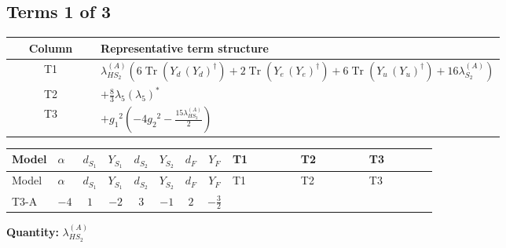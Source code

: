 \documentclass[8pt]{article}
\begin{document}
\begin{landscape}
\subsection*{Terms 1 of 3}
\begin{center}
\begin{tabular}{@{}c >{\raggedright\arraybackslash}p{0.82\linewidth}@{}}
\toprule
Column & Representative term structure \\
\midrule
T1 & \(\displaystyle {\lambda_{HS_2}^{(A)}} (6 \operatorname{Tr}\!\left({Y_d}\,\left({Y_d}\right)^{\dagger}\right)+2 \operatorname{Tr}\!\left({Y_e}\,\left({Y_e}\right)^{\dagger}\right)+6 \operatorname{Tr}\!\left({Y_u}\,\left({Y_u}\right)^{\dagger}\right)+16 {\lambda_{S_2}^{(A)}})\) \\
\midrule
T2 & \(\displaystyle +\frac{8}{3} {\lambda_5} \left({\lambda_5}\right)^{*}\) \\
\midrule
T3 & \(\displaystyle +{g_1}^2 \left(-4 {g_2}^2-\frac{15 {\lambda_{HS_2}^{(A)}}}{2}\right)\) \\
\midrule
\bottomrule
\end{tabular}
\end{center}
\smallskip
\tiny
\begin{longtable}{@{}llcccccc >{\raggedright\arraybackslash}p{0.21\linewidth} >{\raggedright\arraybackslash}p{0.21\linewidth} >{\raggedright\arraybackslash}p{0.21\linewidth}@{}}
\toprule
Model & $\alpha$ & $d_{S_1}$ & $Y_{S_1}$ & $d_{S_2}$ & $Y_{S_2}$ & $d_F$ & $Y_F$ & T1 & T2 & T3 \\
\midrule
\endfirsthead
\toprule
Model & $\alpha$ & $d_{S_1}$ & $Y_{S_1}$ & $d_{S_2}$ & $Y_{S_2}$ & $d_F$ & $Y_F$ & T1 & T2 & T3 \\
\midrule
\endhead
T3-A & $-4$ & $1$ & $-2$ & $3$ & $-1$ & $2$ & $-\frac{3}{2}$ & \scriptsize\adjustbox{max width=\linewidth}{$\begin{gathered} {\lambda_{HS_2}^{(A)}} (6 \operatorname{Tr}\!\left({Y_d}\,\left({Y_d}\right)^{\dagger}\right)+2 \operatorname{Tr}\!\left({Y_e}\,\left({Y_e}\right)^{\dagger}\right)+6 \operatorname{Tr}\!\left({Y_u}\,\left({Y_u}\right)^{\dagger}\right)+16 {\lambda_{S_2}^{(A)}})\end{gathered}$} & \scriptsize\adjustbox{max width=\linewidth}{$\begin{gathered} +\frac{8}{3} {\lambda_5} \left({\lambda_5}\right)^{*}\end{gathered}$} & \scriptsize\adjustbox{max width=\linewidth}{$\begin{gathered} +{g_1}^2 \left(-4 {g_2}^2-\frac{15 {\lambda_{HS_2}^{(A)}}}{2}\right)\end{gathered}$} \\
\midrule
\bottomrule
\end{longtable}
\clearpage
\noindent\textbf{Quantity: }$\lambda_{HS_2}^{(A)}$\par\smallskip

\end{landscape}
\end{document}
